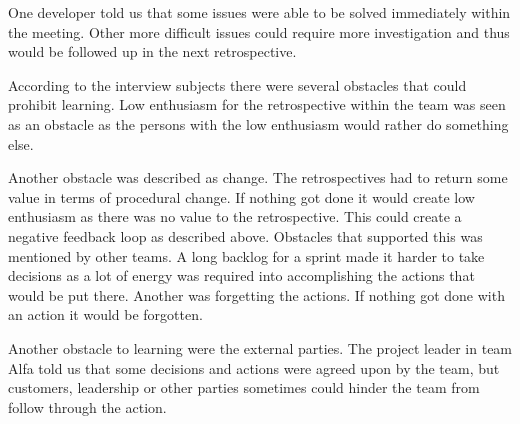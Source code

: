 One developer told us that some issues were able to be solved immediately within the meeting. Other more difficult issues could require more investigation and thus would be followed up in the next retrospective. 
\begin{table}[!h]
	\begin{center}
	\caption{Root-Cause identifying techniques used.}
	\label{table:root-cause-technique}
	\end{center}
\end{table}

\label{question-14}
According to the interview subjects there were several obstacles that could prohibit learning. Low enthusiasm for the retrospective within the team was seen as an obstacle as the persons with the low enthusiasm would rather do something else. 

Another obstacle was described as change. The retrospectives had to return some value in terms of procedural change. If nothing got done it would create low enthusiasm as there was no value to the retrospective. This could create a negative feedback loop as described above. Obstacles that supported this was mentioned by other teams. A long backlog for a sprint made it harder to take decisions as a lot of energy was required into accomplishing the actions that would be put there. Another was forgetting the actions. If nothing got done with an action it would be forgotten.

Another obstacle to learning were the external parties. The project leader in team Alfa told us that some decisions and actions were agreed upon by the team, but customers, leadership or other parties sometimes could hinder the team from follow through the action. 

